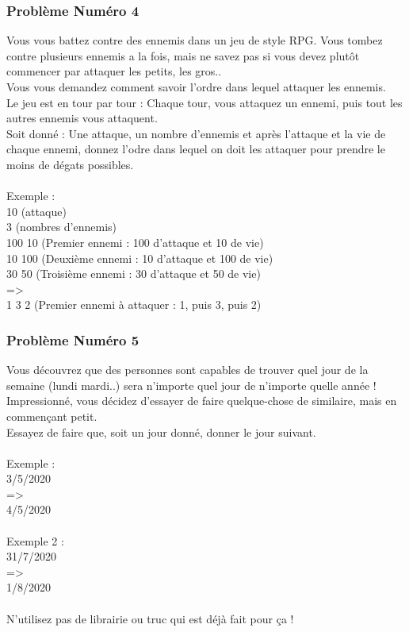 \documentclass[12pt]{article}
\begin{document}
\subsubsection{Problème Numéro 4}

Vous vous battez contre des ennemis dans un jeu de style RPG. Vous tombez contre plusieurs ennemis a la fois, mais ne savez pas si vous devez plutôt commencer par attaquer les petits, les gros..\\
Vous vous demandez comment savoir l'ordre dans lequel attaquer les ennemis.\\
Le jeu est en tour par tour : Chaque tour, vous attaquez un ennemi, puis tout les autres ennemis vous attaquent.\\
Soit donné : Une attaque, un nombre d'ennemis et après l'attaque et la vie de chaque ennemi, donnez l'odre dans lequel on doit les attaquer pour prendre le moins de dégats possibles.
\\\\
Exemple :\\
10 (attaque)\\
3 (nombres d'ennemis)\\
100 10 (Premier ennemi : 100 d'attaque et 10 de vie)\\
10 100 (Deuxième ennemi : 10 d'attaque et 100 de vie)\\
30 50 (Troisième ennemi : 30 d'attaque et 50 de vie)\\
=\textgreater\\
1 3 2 (Premier ennemi à attaquer : 1, puis 3, puis 2)

\subsubsection{Problème Numéro 5}

Vous découvrez que des personnes sont capables de trouver quel jour de la semaine (lundi mardi..) sera n'importe quel jour de n'importe quelle année !\\
Impressionné, vous décidez d'essayer de faire quelque-chose de similaire, mais en commençant petit.\\
Essayez de faire que, soit un jour donné, donner le jour suivant.
\\\\
Exemple :\\
3/5/2020\\
=\textgreater\\
4/5/2020
\\\\
Exemple 2 :\\
31/7/2020\\
=\textgreater\\
1/8/2020
\\\\
N'utilisez pas de librairie ou truc qui est déjà fait pour ça !
\end{document}
